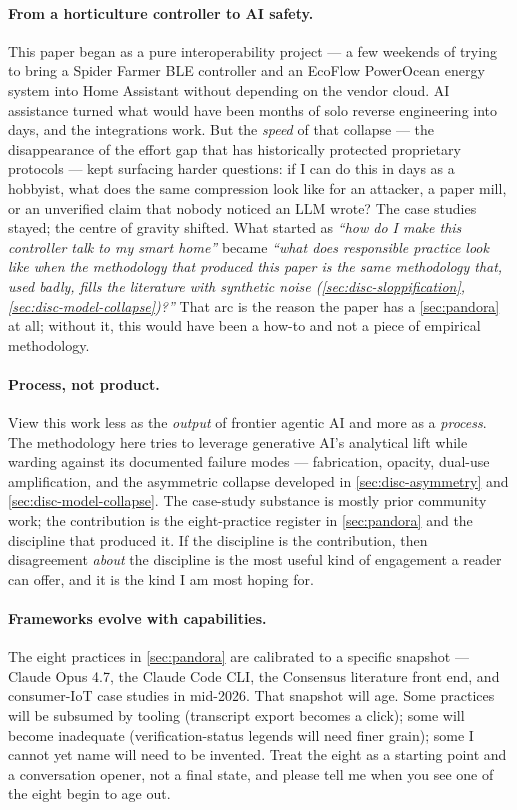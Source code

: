 \documentclass[11pt,a4paper]{article}
\begin{document}
\paragraph{From a horticulture controller to AI safety.}
This paper began as a pure interoperability project --- a few weekends
of trying to bring a Spider Farmer BLE controller and an EcoFlow
PowerOcean energy system into Home Assistant without depending on the
vendor cloud. AI assistance turned what would have been months of solo
reverse engineering into days, and the integrations work. But the
\emph{speed} of that collapse --- the disappearance of the effort gap
that has historically protected proprietary protocols --- kept
surfacing harder questions: if I can do this in days as a hobbyist,
what does the same compression look like for an attacker, a paper
mill, or an unverified claim that nobody noticed an LLM wrote? The
case studies stayed; the centre of gravity shifted. What started as
\emph{``how do I make this controller talk to my smart home''} became
\emph{``what does responsible practice look like when the methodology
that produced this paper is the same methodology that, used badly,
fills the literature with synthetic noise
(\cref{sec:disc-sloppification},
\cref{sec:disc-model-collapse})?''} That arc is the reason the paper
has a \cref{sec:pandora} at all; without it, this would have been a
how-to and not a piece of empirical methodology.

\paragraph{Process, not product.}
View this work less as the \emph{output} of frontier agentic AI and
more as a \emph{process}. The methodology here tries to leverage
generative AI's analytical lift while warding against its documented
failure modes --- fabrication, opacity, dual-use amplification, and the
asymmetric collapse developed in \cref{sec:disc-asymmetry} and
\cref{sec:disc-model-collapse}. The case-study substance is mostly
prior community work; the contribution is the eight-practice register
in \cref{sec:pandora} and the discipline that produced it. If the
discipline is the contribution, then disagreement \emph{about} the
discipline is the most useful kind of engagement a reader can offer,
and it is the kind I am most hoping for.

\paragraph{Frameworks evolve with capabilities.}
The eight practices in \cref{sec:pandora} are calibrated to a specific
snapshot --- Claude Opus 4.7, the Claude Code CLI, the Consensus
literature front end, and consumer-IoT case studies in mid-2026. That
snapshot will age. Some practices will be subsumed by tooling
(transcript export becomes a click); some will become inadequate
(verification-status legends will need finer grain); some I cannot yet
name will need to be invented. Treat the eight as a starting point and
a conversation opener, not a final state, and please tell me when you
see one of the eight begin to age out.
\end{document}
